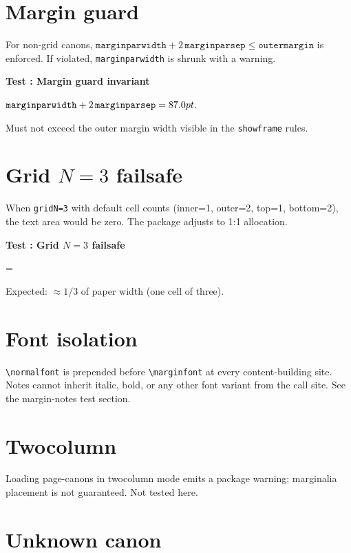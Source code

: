 \documentclass[11pt, twoside, openany]{book}
\newcommand{\showlen}[2]{\noindent\texttt{#1} = \the#2\par}
\newcommand{\pkg}[1]{\textsf{#1}}
\newcommand{\cmd}[1]{\texttt{\textbackslash #1}}
\newcounter{testnum}
\newcommand{\test}[1]{%
  \stepcounter{testnum}%
  \par\medskip\noindent
  \textbf{Test \thetestnum: #1}\par\smallskip}
\begin{document}
\section{Margin guard}\label{sec:guard}

For non-grid canons, $\texttt{marginparwidth} + 2\,\texttt{marginparsep} \leq \texttt{outermargin}$ is enforced. If violated, \texttt{marginparwidth} is shrunk with a warning.

\test{Margin guard invariant}

$\texttt{marginparwidth} + 2\,\texttt{marginparsep} = \the\dimexpr\marginparwidth+2\marginparsep\relax$.

Must not exceed the outer margin width visible in the \texttt{showframe} rules.

\section{Grid $N=3$ failsafe}\label{sec:N3}

When \texttt{gridN=3} with default cell counts (inner=1, outer=2, top=1, bottom=2), the text area would be zero. The package adjusts to 1:1 allocation.

\test{Grid $N=3$ failsafe}


\showlen{\string\textwidth}{\textwidth}

Expected: $\approx 1/3$ of paper width (one cell of three).


\section{Font isolation}\label{sec:isolation}

\cmd{normalfont} is prepended before \cmd{marginfont} at every content-building site. Notes cannot inherit italic, bold, or any other font variant from the call site. See the margin-notes test section.

\section{Twocolumn}\label{sec:twocolumn}

Loading \pkg{page-canons} in twocolumn mode emits a package warning; marginalia placement is not guaranteed. Not tested here.

\section{Unknown canon}\label{sec:unknown}
\end{document}
